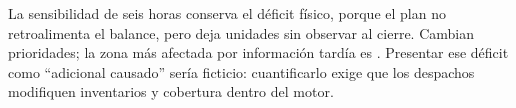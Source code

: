 \documentclass[11pt,letterpaper]{article}
\begin{document}
La sensibilidad de seis horas conserva el déficit físico, porque el plan no
retroalimenta el balance, pero deja \DeficitNoObservadoRetraso{} unidades sin
observar al cierre. Cambian \RutasCambioPrioridad{} prioridades; la zona más
afectada por información tardía es \ZonaAfectadaRetraso{}. Presentar ese déficit
como ``adicional causado'' sería ficticio: cuantificarlo exige que los despachos
modifiquen inventarios y cobertura dentro del motor.

\begin{table}[H]
\centering
\caption{Sensibilidad a seis horas de retraso informativo.}
\label{tab:sensibilidad}
\small

\end{table}
\end{document}

